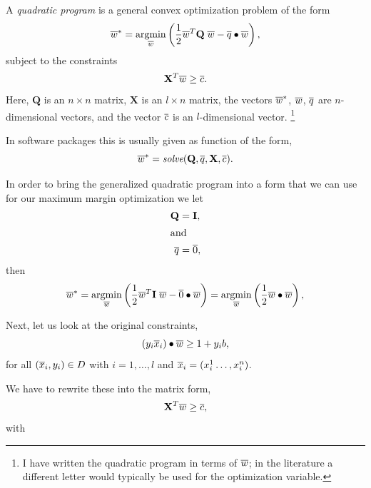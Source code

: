 \documentclass[a4paper,blends,pdf,colorBG,slideColor]{prosper}
\begin{document}
A {\em quadratic program} is a general convex optimization problem of the form
\begin{equation*}
\ol{w}^* =  \argmin_{\ol{w}} \left (\frac{1}{2} \ol{w}^T {\mathbf Q}\; \ol{w} - \ol{q}\bullet\ol{w}\right ),
\end{equation*}
subject to the constraints
\begin{equation*}
\label{eq;constraint-matrix}
{\mathbf X}^T\overline{w} \ge \overline{c}.
\end{equation*}
Here, $\mathbf Q$ is an $n\times n$ matrix, $\mathbf X$ is an $l\times n$ matrix, the vectors
$\overline{w}^*$, $\overline{w}$, $\overline{q}$ are $n$-dimensional vectors, and the vector $\overline{c}$ is an
$l$-dimensional vector. \footnote{I have written the quadratic program in terms of $\overline{w}$;
in the literature a different letter would typically be used for the optimization variable.}

In software packages this is usually given as function of the form,
\begin{equation*}
\overline{w}^* = \mbox{\it solve}({\mathbf Q}, \overline{q}, {\mathbf X}, \overline{c}).
\end{equation*}
\vspace{.2in}

\es

In order to bring the generalized quadratic program into a form that we can use
for our maximum margin optimization we let 
\begin{align*}
{\mathbf Q}&={\mathbf I},\\
\intertext{and} 
\overline{q} &= \overline{0},
\end{align*}
then
\begin{equation*}
\ol{w}^* =  \argmin_{\ol{w}} \left (\frac{1}{2} \ol{w}^T {\mathbf I}\; \ol{w} - \ol{0}\bullet \ol{w} \right )= \argmin_{\ol{w}} \left ( \frac{1}{2}\ol{w}\bullet\ol{w} \right ),
\end{equation*}

\es

Next, let us look at the original constraints,
\begin{equation*}
(y_i \overline{x}_i)\bullet\overline{w} \ge 1+ y_i b,
\end{equation*}
for all $(\overline{x}_i, y_i) \in D$ with $i = 1,\ldots, l$ and $\overline{x}_i = (x_i^1\ldots,x_i^n)$. 

We have to rewrite these into the matrix form,
\begin{equation*}
{\mathbf X}^T\overline{w} \ge \overline{c},
\end{equation*}
with
\end{document}
